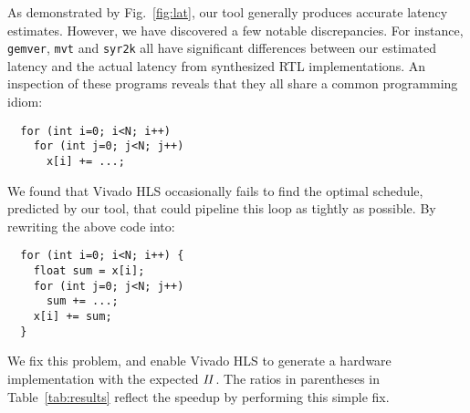 As demonstrated by Fig.~\ref{fig:lat}, our tool generally produces accurate
latency estimates. However, we have discovered a few notable discrepancies. For
instance, \verb|gemver|, \verb|mvt| and \verb|syr2k| all have significant
differences between our estimated latency and the actual latency from
synthesized RTL implementations.  An inspection of these programs reveals that
they all share a common programming idiom:
%
\begin{lstlisting}
  for (int i=0; i<N; i++)
    for (int j=0; j<N; j++)
      x[i] += ...;
\end{lstlisting}
%
We found that Vivado HLS occasionally fails to find the optimal schedule,
predicted by our tool, that could pipeline this loop as tightly as possible.
By rewriting the above code into:
%
\begin{lstlisting}
  for (int i=0; i<N; i++) {
    float sum = x[i];
    for (int j=0; j<N; j++)
      sum += ...;
    x[i] += sum;
  }
\end{lstlisting}
%
We fix this problem, and enable Vivado HLS to generate a hardware implementation
with the expected $\mathit{II}$. The ratios in parentheses in Table~\ref{tab:results}
reflect the speedup by performing this simple fix.


